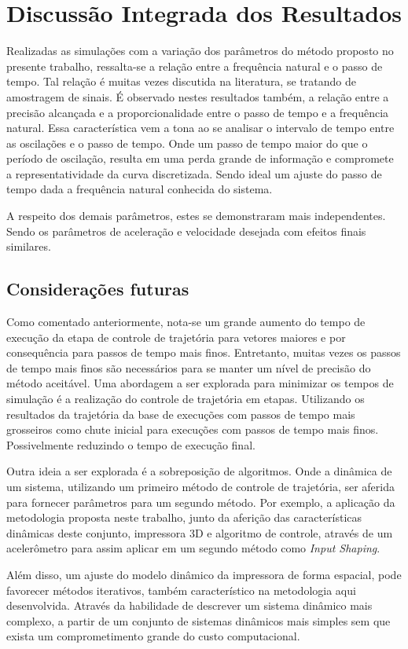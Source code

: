 \section{Discussão Integrada dos Resultados}
Realizadas as simulações com a variação dos parâmetros do método proposto no presente trabalho, ressalta-se a relação entre a frequência natural e o passo de tempo. Tal relação é muitas vezes discutida na literatura, se tratando de amostragem de sinais. É observado nestes resultados também, a relação entre a precisão alcançada e a proporcionalidade entre o passo de tempo e a frequência natural. Essa característica vem a tona ao se analisar o intervalo de tempo entre as oscilações e o passo de tempo. Onde um passo de tempo maior do que o período de oscilação, resulta em uma perda grande de informação e compromete a representatividade da curva discretizada. Sendo ideal um ajuste do passo de tempo dada a frequência natural conhecida do sistema.

A respeito dos demais parâmetros, estes se demonstraram mais independentes. Sendo os parâmetros de aceleração e velocidade desejada com efeitos finais similares.

\subsection{Considerações futuras}
Como comentado anteriormente, nota-se um grande aumento do tempo de execução da etapa de controle de trajetória para vetores maiores e por consequência para passos de tempo mais finos. Entretanto, muitas vezes os passos de tempo mais finos são necessários para se manter um nível de precisão do método aceitável. Uma abordagem a ser explorada para minimizar os tempos de simulação é a realização do controle de trajetória em etapas. Utilizando os resultados da trajetória da base de execuções com passos de tempo mais grosseiros como chute inicial para execuções com passos de tempo mais finos. Possivelmente reduzindo o tempo de execução final.

Outra ideia a ser explorada é a sobreposição de algoritmos. Onde
a dinâmica de um sistema, utilizando um primeiro método de controle de trajetória, ser aferida para fornecer parâmetros para um segundo método. Por exemplo, a aplicação da metodologia proposta neste trabalho, junto da aferição das características dinâmicas deste conjunto, impressora 3D e algoritmo de controle, através de um acelerômetro para assim aplicar em um segundo método como \textit{Input Shaping}.

Além disso, um ajuste do modelo dinâmico da impressora de forma espacial, pode favorecer métodos iterativos, também característico na metodologia aqui desenvolvida. Através da habilidade de descrever um sistema dinâmico mais complexo, a partir de um conjunto de sistemas dinâmicos mais simples sem que exista um comprometimento grande do custo computacional.



